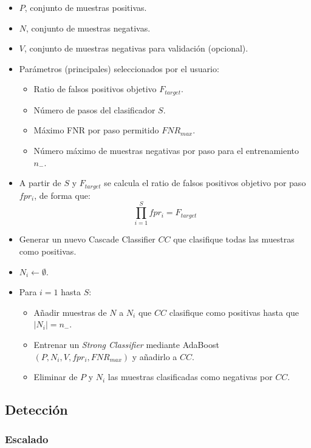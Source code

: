 \documentclass[11pt,spanish,a4paper]{article} %
\begin{document}
\begin{footnotesize}
\begin{itemize}
\item $P$, conjunto de muestras positivas.
\item $N$, conjunto de muestras negativas.
\item $V$, conjunto de muestras negativas para validación (opcional).
\item Parámetros (principales) seleccionados por el usuario:
  \begin{itemize}
  \item Ratio de falsos positivos objetivo $F_{target}$.
  \item Número de pasos del clasificador $S$.
  \item Máximo FNR por paso permitido $FNR_{max}$.
  \item Número máximo de muestras negativas por paso para el entrenamiento $n_{-}$.
  \end{itemize}
\item A partir de $S$ y $F_{target}$ se calcula el ratio de falsos positivos objetivo por paso $fpr_i$, de forma que:\[ \prod_{i=1}^{S} fpr_i = F_{target} \]
\item Generar un nuevo Cascade Classifier $CC$ que clasifique todas las muestras como positivas.
\item $N_i \leftarrow \emptyset$.
\item Para $i=1$ hasta $S$:
  \begin{itemize}
  \item Añadir muestras de $N$ a $N_i$ que $CC$ clasifique como positivas hasta que $|N_i| = n_{-}$.
  \item Entrenar un \textit{Strong Classifier} mediante AdaBoost $(P, N_i, V, fpr_i, FNR_{max})$ y añadirlo a $CC$.
  \item Eliminar de $P$ y $N_i$ las muestras clasificadas como negativas por $CC$.
  \end{itemize}
\end{itemize}
\end{footnotesize}

\subsection{Detección}

\subsubsection{Escalado}
\end{document}
